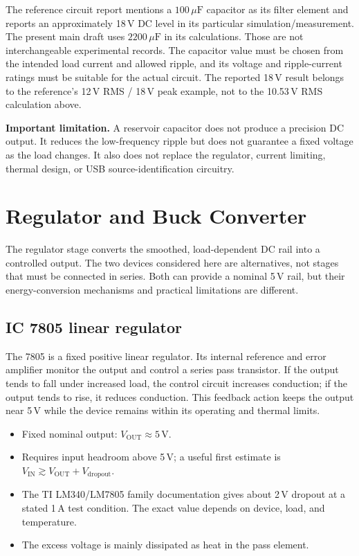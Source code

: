 \documentclass[journal,12pt,twocolumn]{IEEEtran}
\begin{document}
The reference circuit report mentions a $100\,\mu\mathrm{F}$
capacitor as its filter element and reports an approximately
18\,V DC level in its particular simulation/measurement. The
present main draft uses $2200\,\mu\mathrm{F}$ in its calculations.
Those are not interchangeable experimental records. The capacitor
value must be chosen from the intended load current and allowed
ripple, and its voltage and ripple-current ratings must be suitable
for the actual circuit. The reported 18\,V result belongs to the
reference's 12\,V RMS / 18\,V peak example, not to the
10.53\,V RMS calculation above.

\textbf{Important limitation.} A reservoir capacitor does not
produce a precision DC output. It reduces the low-frequency ripple
but does not guarantee a fixed voltage as the load changes. It also
does not replace the regulator, current limiting, thermal design,
or USB source-identification circuitry.

\section{Regulator and Buck Converter}
The regulator stage converts the smoothed, load-dependent DC rail
into a controlled output. The two devices considered here are
alternatives, not stages that must be connected in series. Both
can provide a nominal 5\,V rail, but their energy-conversion
mechanisms and practical limitations are different.

\subsection{IC 7805 linear regulator}
The 7805 is a fixed positive linear regulator. Its internal reference
and error amplifier monitor the output and control a series pass
transistor. If the output tends to fall under increased load, the
control circuit increases conduction; if the output tends to rise,
it reduces conduction. This feedback action keeps the output near
5\,V while the device remains within its operating and thermal
limits.

\begin{itemize}[leftmargin=1.5em]
    \item Fixed nominal output: $V_{\mathrm{OUT}}\approx5\,\mathrm{V}$.
    \item Requires input headroom above 5\,V; a useful first estimate
    is $V_{\mathrm{IN}}\gtrsim V_{\mathrm{OUT}}+V_{\mathrm{dropout}}$.
    \item The TI LM340/LM7805 family documentation gives about
    2\,V dropout at a stated 1\,A test condition. The exact value
    depends on device, load, and temperature.
    \item The excess voltage is mainly dissipated as heat in the
    pass element.
\end{itemize}
\end{document}
